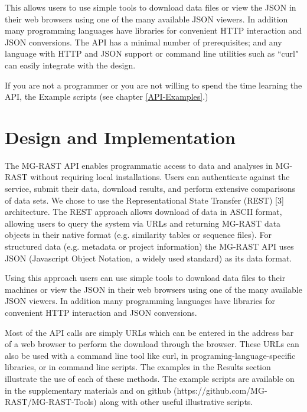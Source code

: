 This allows users to use simple tools to download data files or view the JSON in their web browsers using one of the many available JSON viewers. In addition many programming languages have libraries for convenient HTTP interaction and JSON conversions. The API has a minimal number of prerequisites; and any language with HTTP and JSON support or command line utilities such as ``curl" can easily integrate with the design. 

If you are not a programmer or you are not willing to spend the time learning the API, the Example scripts (see chapter \ref{API-Examples}.) 
\section{Design and Implementation}
The MG-RAST API enables programmatic access to data and analyses in MG-RAST without requiring local installations. Users can authenticate against the service, submit their data, download results, and perform extensive comparisons of data sets. We chose to use the Representational State Transfer (REST) [3] architecture. The REST approach allows download of data in ASCII format, allowing users to query the system via URLs and returning  MG-RAST data objects in their native format (e.g. similarity tables or sequence files). For structured data (e.g. metadata or project information) the MG-RAST API uses JSON (Javascript Object Notation, a widely used standard) as its data format. 

Using this approach users can use simple tools to download data files to their machines or view the JSON in their web browsers using one of the many available JSON viewers. In addition many programming languages have libraries for convenient HTTP interaction and JSON conversions. 

Most of the API calls are simply URLs which can be entered in the address bar of a web browser to perform the download through the browser. These URLs can also be used with a command line tool like curl, in programing-language-specific libraries, or in command line scripts. The examples in the Results section illustrate the use of each of these methods. The example scripts are available on in the supplementary materials and on github (https://github.com/MG-RAST/MG-RAST-Tools) along with other useful illustrative scripts.

